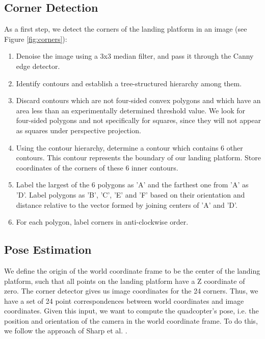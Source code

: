 \documentclass[10pt]{scrartcl} %
\begin{document}
\subsection{Corner Detection}

As a first step, we detect the corners of the landing platform in an image (see
Figure \ref{fig:corners}):

\begin{enumerate}
\setlength{\itemsep}{0pt}
\setlength{\parskip}{0pt}
\setlength{\parsep}{0pt}
\item{
    Denoise the image using a 3x3 median filter, and pass it through the Canny
    edge detector.}
\item{
    Identify contours and establish a tree-structured hierarchy among them.}
\item{
    Discard contours which are not four-sided convex polygons and which have an
    area less than an experimentally determined threshold value.  We look for
    four-sided polygons and not specifically for squares, since they will not
    appear as squares under perspective projection.}
\item{
    Using the contour hierarchy, determine a contour which contains 6 other
    contours. This contour represents the boundary of our landing platform.
    Store coordinates of the corners of these 6 inner contours.}
\item{
    Label the largest of the 6 polygons as 'A' and the farthest one from 'A' as
    'D'. Label polygons as 'B', 'C', 'E' and 'F' based on their orientation and
    distance relative to the vector formed by joining centers of 'A' and 'D'.}
\item{
    For each polygon, label corners in anti-clockwise order.}
\end{enumerate}


\subsection{Pose Estimation}

We define the origin of the world coordinate frame to be the center of the
landing platform, such that all points on the landing platform have a Z
coordinate of zero. The corner detector gives us image coordinates for the 24
corners. Thus, we have a set of 24 point correspondences between world
coordinates and image coordinates. Given this input, we want to compute the
quadcopter's pose, i.e. the position and orientation of the camera in the world
coordinate frame. To do this, we follow the approach of Sharp et al.
\cite{sharp_et_al_2001}.
\end{document}
